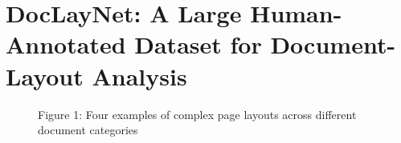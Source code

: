 \section*{DocLayNet: A Large Human-Annotated Dataset for Document-Layout Analysis}

\begin{figure}[h]
\caption{Figure 1: Four examples of complex page layouts across different document categories}
\end{figure}

